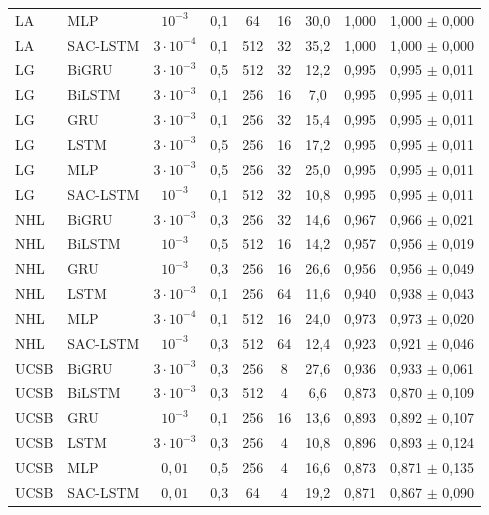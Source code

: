 \begin{table}[H]
{\begin{tabular}{llccccccc}
LA & MLP & $10^{-3}$ & 0{,}1 & 64 & 16 & 30{,}0 & 1{,}000 & 1{,}000 $\pm$ 0{,}000 \\
LA & SAC-LSTM & $3 \cdot 10^{-4}$ & 0{,}1 & 512 & 32 & 35{,}2 & 1{,}000 & 1{,}000 $\pm$ 0{,}000 \\
\midrule
LG & BiGRU & $3 \cdot 10^{-3}$ & 0{,}5 & 512 & 32 & 12{,}2 & 0{,}995 & 0{,}995 $\pm$ 0{,}011 \\
LG & BiLSTM & $3 \cdot 10^{-3}$ & 0{,}1 & 256 & 16 & 7{,}0 & 0{,}995 & 0{,}995 $\pm$ 0{,}011 \\
LG & GRU & $3 \cdot 10^{-3}$ & 0{,}1 & 256 & 32 & 15{,}4 & 0{,}995 & 0{,}995 $\pm$ 0{,}011 \\
LG & LSTM & $3 \cdot 10^{-3}$ & 0{,}5 & 256 & 16 & 17{,}2 & 0{,}995 & 0{,}995 $\pm$ 0{,}011 \\
LG & MLP & $3 \cdot 10^{-3}$ & 0{,}5 & 256 & 32 & 25{,}0 & 0{,}995 & 0{,}995 $\pm$ 0{,}011 \\
LG & SAC-LSTM & $10^{-3}$ & 0{,}1 & 512 & 32 & 10{,}8 & 0{,}995 & 0{,}995 $\pm$ 0{,}011 \\
\midrule
NHL & BiGRU & $3 \cdot 10^{-3}$ & 0{,}3 & 256 & 32 & 14{,}6 & 0{,}967 & 0{,}966 $\pm$ 0{,}021 \\
NHL & BiLSTM & $10^{-3}$ & 0{,}5 & 512 & 16 & 14{,}2 & 0{,}957 & 0{,}956 $\pm$ 0{,}019 \\
NHL & GRU & $10^{-3}$ & 0{,}3 & 256 & 16 & 26{,}6 & 0{,}956 & 0{,}956 $\pm$ 0{,}049 \\
NHL & LSTM & $3 \cdot 10^{-3}$ & 0{,}1 & 256 & 64 & 11{,}6 & 0{,}940 & 0{,}938 $\pm$ 0{,}043 \\
NHL & MLP & $3 \cdot 10^{-4}$ & 0{,}1 & 512 & 16 & 24{,}0 & 0{,}973 & 0{,}973 $\pm$ 0{,}020 \\
NHL & SAC-LSTM & $10^{-3}$ & 0{,}3 & 512 & 64 & 12{,}4 & 0{,}923 & 0{,}921 $\pm$ 0{,}046 \\
\midrule
UCSB & BiGRU & $3 \cdot 10^{-3}$ & 0{,}3 & 256 & 8 & 27{,}6 & 0{,}936 & 0{,}933 $\pm$ 0{,}061 \\
UCSB & BiLSTM & $3 \cdot 10^{-3}$ & 0{,}3 & 512 & 4 & 6{,}6 & 0{,}873 & 0{,}870 $\pm$ 0{,}109 \\
UCSB & GRU & $10^{-3}$ & 0{,}1 & 256 & 16 & 13{,}6 & 0{,}893 & 0{,}892 $\pm$ 0{,}107 \\
UCSB & LSTM & $3 \cdot 10^{-3}$ & 0{,}3 & 256 & 4 & 10{,}8 & 0{,}896 & 0{,}893 $\pm$ 0{,}124 \\
UCSB & MLP & $0{,}01$ & 0{,}5 & 256 & 4 & 16{,}6 & 0{,}873 & 0{,}871 $\pm$ 0{,}135 \\
UCSB & SAC-LSTM & $0{,}01$ & 0{,}3 & 64 & 4 & 19{,}2 & 0{,}871 & 0{,}867 $\pm$ 0{,}090 \\
\bottomrule
\end{tabular}%
}
\end{table}

